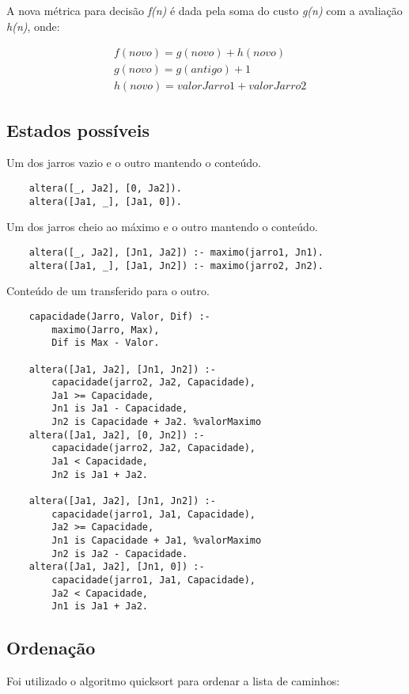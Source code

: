 \documentclass[12pt,a4paper]{article}
\begin{document}
\noindent
A nova métrica para decisão \textit{f(n)} é dada pela soma do custo \textit{g(n)} com a avaliação \textit{h(n)}, onde:

\begin{equation*}
 	\begin{aligned}
 		&f(novo) = g(novo) + h(novo) \\
 		&g(novo) = g(antigo) + 1 \\
 		&h(novo) = valorJarro1 + valorJarro2
 	\end{aligned}
\end{equation*}

\subsection{Estados possíveis}
Um dos jarros vazio e o outro mantendo o conteúdo.
\begin{verbatim}
	altera([_, Ja2], [0, Ja2]).
	altera([Ja1, _], [Ja1, 0]).
\end{verbatim}

\noindent
Um dos jarros cheio ao máximo e o outro mantendo o conteúdo.
\begin{verbatim}
	altera([_, Ja2], [Jn1, Ja2]) :- maximo(jarro1, Jn1).
	altera([Ja1, _], [Ja1, Jn2]) :- maximo(jarro2, Jn2).
\end{verbatim}

\noindent
Conteúdo de um transferido para o outro.
\begin{verbatim}
	capacidade(Jarro, Valor, Dif) :-
	    maximo(Jarro, Max),
	    Dif is Max - Valor.
	
	altera([Ja1, Ja2], [Jn1, Jn2]) :- 
	    capacidade(jarro2, Ja2, Capacidade),
	    Ja1 >= Capacidade,
	    Jn1 is Ja1 - Capacidade,
	    Jn2 is Capacidade + Ja2. %valorMaximo
	altera([Ja1, Ja2], [0, Jn2]) :- 
	    capacidade(jarro2, Ja2, Capacidade),
	    Ja1 < Capacidade,
	    Jn2 is Ja1 + Ja2.
	
	altera([Ja1, Ja2], [Jn1, Jn2]) :- 
	    capacidade(jarro1, Ja1, Capacidade),
	    Ja2 >= Capacidade,
	    Jn1 is Capacidade + Ja1, %valorMaximo
	    Jn2 is Ja2 - Capacidade.
	altera([Ja1, Ja2], [Jn1, 0]) :- 
	    capacidade(jarro1, Ja1, Capacidade),
	    Ja2 < Capacidade,
	    Jn1 is Ja1 + Ja2.
\end{verbatim}

\subsection{Ordenação}
Foi utilizado o algoritmo quicksort para ordenar a lista de caminhos:
\end{document}
